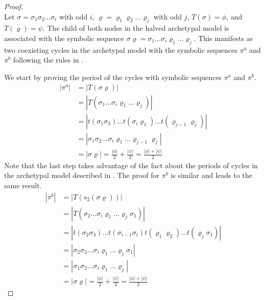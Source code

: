 \begin{proof} \phantom{x} \\
	Let $\sigma = \sigma_1\sigma_2 \dots \sigma_i$ with odd $i$, $\varrho = \varrho_1\varrho_2 \dots \varrho_j$ with odd $j$, $T(\sigma) = \phi$, and $T(\varrho) = \psi$.
	The child of both nodes in the halved archetypal model is associated with the symbolic sequence $\sigma\varrho = \sigma_1 \dots \sigma_i \varrho_1 \dots \varrho_j$.
	This manifests as two coexisting cycles in the archetypal model with the symbolic sequences $\pi^a$ and $\pi^b$ following the rules in .

	We start by proving the period of the cycles with symbolic sequences $\pi^a$ and $\pi^b$.
	\begin{align*}
		|\pi^a| & = |T(\sigma\varrho)|                                                                \\
		        & = |T(\sigma_1 \dots \sigma_i \varrho_1 \dots \varrho_j)|                            \\
		        & = |t(\sigma_1\sigma_2) \dots t(\sigma_i\varrho_1) \dots t(\varrho_{j-1}\varrho_j)|  \\
		        & = |\sigma_1\sigma_2 \dots \sigma_i \varrho_1 \dots \varrho_{j-1}\varrho_j|          \\
		        & = |\sigma\varrho| = \frac{|\phi|}{2} + \frac{|\psi|}{2} = \frac{|\phi| + |\psi|}{2}
	\end{align*}
	Note that the last step takes advantage of the fact about the periods of cycles in the archetypal model described in .
	The proof for $\pi^b$ is similar and leads to the same result.
	\begin{align*}
		|\pi^b| & = |T(s_2(\sigma\varrho))|                                                                              \\
		        & = |T(\sigma_2 \dots \sigma_i \varrho_1 \dots \varrho_j \sigma_1)|                                      \\
		        & = |t(\sigma_2\sigma_3) \dots t(\sigma_{i-1}\sigma_i) t(\varrho_1\varrho_2) \dots t(\varrho_j\sigma_1)| \\
		        & = |\sigma_2\sigma_3 \dots \sigma_i \varrho_1 \dots \varrho_j \sigma_1|                                 \\
		        & = |\sigma_1\sigma_2 \dots \sigma_i \varrho_1 \dots \varrho_j|                                          \\
		        & = |\sigma\varrho| = \frac{|\phi|}{2} + \frac{|\psi|}{2} = \frac{|\phi| + |\psi|}{2}
	\end{align*}


\end{proof}
